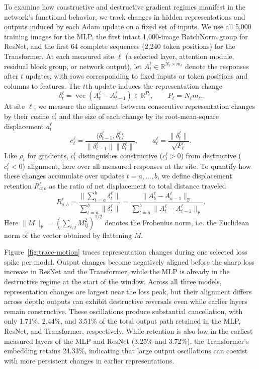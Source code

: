 To examine how constructive and destructive gradient regimes manifest in the network's functional behavior, we track changes in hidden representations and outputs induced by each Adam update on a fixed set of inputs. We use all 5,000 training images for the MLP, the first intact 1,000-image BatchNorm group for ResNet, and the first 64 complete sequences (2,240 token positions) for the Transformer. At each measured site $\ell$ (a selected layer, attention module, residual block group, or network output), let $A_t^\ell\in\mathbb{R}^{N_\ell\times m_\ell}$ denote the responses after $t$ updates, with rows corresponding to fixed inputs or token positions and columns to features. The $t$th update induces the representation change
\begin{equation}
 \delta_t^\ell=\operatorname{vec}(A_t^\ell-A_{t-1}^\ell)
 \in\mathbb R^{P_\ell},\qquad P_\ell=N_\ell m_\ell.
 \label{eq:representation-change}
\end{equation}
At site $\ell$, we measure the alignment between consecutive representation changes by their cosine $c_t^\ell$ and the size of each change by its root-mean-square displacement $a_t^\ell$
\begin{equation}
 c_t^\ell=
 \frac{\langle\delta_{t-1}^\ell,\delta_t^\ell\rangle}
 {\|\delta_{t-1}^\ell\|\|\delta_t^\ell\|},\qquad
 a_t^\ell=\frac{\|\delta_t^\ell\|}{\sqrt{P_\ell}}.
 \label{eq:representation-motion}
\end{equation}
Like $\rho_t$ for gradients, $c_t^\ell$ distinguishes constructive ($c_t^\ell>0$) from destructive ($c_t^\ell<0$) alignment, here over all measured responses at the site. To quantify how these changes accumulate over updates $t=a,\ldots,b$, we define displacement retention $R_{a:b}^\ell$ as the ratio of net displacement to total distance traveled
\begin{equation}
 R_{a:b}^\ell=
 \frac{\|\sum_{t=a}^b\delta_t^\ell\|}{\sum_{t=a}^b\|\delta_t^\ell\|}
 =\frac{\|A_b^\ell-A_{a-1}^\ell\|_{\mathrm{F}}}
 {\sum_{t=a}^b\|A_t^\ell-A_{t-1}^\ell\|_{\mathrm{F}}}.
 \label{eq:representation-retention}
\end{equation}
Here $\|M\|_{\mathrm{F}}=(\sum_{i,j}M_{ij}^2)^{1/2}$ denotes the Frobenius norm, i.e. the Euclidean norm of the vector obtained by flattening $M$.

Figure~\ref{fig:trace-motion} traces representation changes during one selected loss spike per model. Output changes become negatively aligned before the sharp loss increase in ResNet and the Transformer, while the MLP is already in the destructive regime at the start of the window. Across all three models, representation changes are largest near the loss peak, but their alignment differs across depth: outputs can exhibit destructive reversals even while earlier layers remain constructive. These oscillations produce substantial cancellation, with only 1.71\%, 2.44\%, and 3.51\% of the total output path retained in the MLP, ResNet, and Transformer, respectively. While retention is also low in the earliest measured layers of the MLP and ResNet (3.25\% and 3.72\%), the Transformer's embedding retains 24.33\%, indicating that large output oscillations can coexist with more persistent changes in earlier representations.

